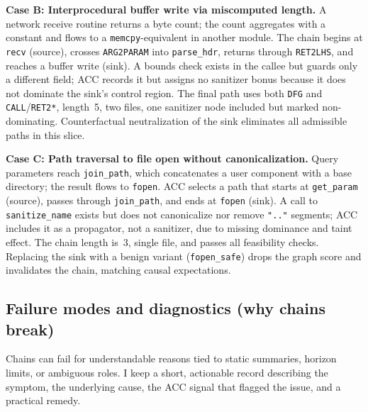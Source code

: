 \documentclass{buthesis}
\begin{document}
\textbf{Case B: Interprocedural buffer write via miscomputed length.}
A network receive routine returns a byte count; the count aggregates with a constant and flows to a \texttt{memcpy}-equivalent in another module. The chain begins at \texttt{recv} (source), crosses \texttt{ARG2PARAM} into \texttt{parse\_hdr}, returns through \texttt{RET2LHS}, and reaches a buffer write (sink). A bounds check exists in the callee but guards only a different field; ACC records it but assigns no sanitizer bonus because it does not dominate the sink’s control region. The final path uses both \texttt{DFG} and \texttt{CALL}/\texttt{RET2*}, length~5, two files, one sanitizer node included but marked non-dominating. Counterfactual neutralization of the sink eliminates all admissible paths in this slice.

\textbf{Case C: Path traversal to file open without canonicalization.}
Query parameters reach \texttt{join\_path}, which concatenates a user component with a base directory; the result flows to \texttt{fopen}. ACC selects a path that starts at \texttt{get\_param} (source), passes through \texttt{join\_path}, and ends at \texttt{fopen} (sink). A call to \texttt{sanitize\_name} exists but does not canonicalize nor remove \texttt{".."} segments; ACC includes it as a propagator, not a sanitizer, due to missing dominance and taint effect. The chain length is~3, single file, and passes all feasibility checks. Replacing the sink with a benign variant (\texttt{fopen\_safe}) drops the graph score and invalidates the chain, matching causal expectations.

\subsection{Failure modes and diagnostics (why chains break)}
\label{subsec:qual-fail}

Chains can fail for understandable reasons tied to static summaries, horizon limits, or ambiguous roles. I keep a short, actionable record describing the symptom, the underlying cause, the ACC signal that flagged the issue, and a practical remedy.
\end{document}
